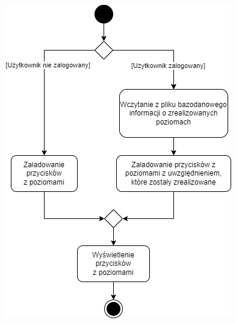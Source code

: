\documentclass[12pt,a4paper]{article} %
\begin{document}
\begin{figure}[h]
	\centering
	\begin{minipage}{.5\textwidth}
	  \centering
	  \includegraphics[width=.8\textwidth]{images/diagramy_czynnosci/plan-diagram_czynnosc_wybor_poziomu.png}
	  \label{rys:diagram_czynnosc_wybor_poziomu}
	\end{minipage}%
	\begin{minipage}{.5\textwidth}
	  \centering

\end{minipage}
\end{figure}
\end{document}
